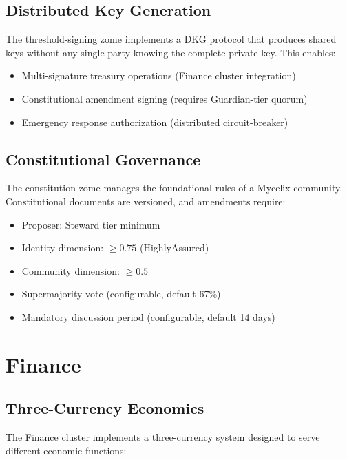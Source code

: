 \documentclass[12pt]{book}
\begin{document}
\section{Distributed Key Generation}

The threshold-signing zome implements a DKG protocol that produces shared keys
without any single party knowing the complete private key. This enables:

\begin{itemize}
  \item Multi-signature treasury operations (Finance cluster integration)
  \item Constitutional amendment signing (requires Guardian-tier quorum)
  \item Emergency response authorization (distributed circuit-breaker)
\end{itemize}

\section{Constitutional Governance}

The constitution zome manages the foundational rules of a Mycelix community.
Constitutional documents are versioned, and amendments require:

\begin{itemize}
  \item Proposer: Steward tier minimum
  \item Identity dimension: $\geq 0.75$ (HighlyAssured)
  \item Community dimension: $\geq 0.5$
  \item Supermajority vote (configurable, default 67\%)
  \item Mandatory discussion period (configurable, default 14 days)
\end{itemize}


\chapter{Finance}
\label{ch:finance}

\section{Three-Currency Economics}

The Finance cluster implements a three-currency system designed to serve
different economic functions:
\end{document}
